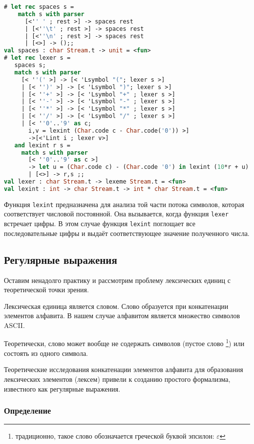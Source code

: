 \begin{lstlisting}[language=Caml]
# let rec spaces s =
    match s with parser
      [<'' ' ; rest >] -> spaces rest
      | [<''\t' ; rest >] -> spaces rest
      | [<''\n' ; rest >] -> spaces rest
      | [<>] -> ();;
val spaces : char Stream.t -> unit = <fun>
# let rec lexer s =
   spaces s;
   match s with parser
     [< ''(' >] -> [< 'Lsymbol "("; lexer s >]
     | [< '')' >] -> [< 'Lsymbol ")"; lexer s >]
     | [< ''+' >] -> [< 'Lsymbol "+" ; lexer s >]
     | [< ''-' >] -> [< 'Lsymbol "-" ; lexer s >]
     | [< ''*' >] -> [< 'Lsymbol "*" ; lexer s >]
     | [< ''/' >] -> [< 'Lsymbol "/" ; lexer s >]
     | [< ''0'..'9' as c;
       i,v = lexint (Char.code c - Char.code('0')) >]
       ->[<'Lint i ; lexer v>]
   and lexint r s =
     match s with parser
       [< ''0'..'9' as c >]
       -> let u = (Char.code c) - (Char.code '0') in lexint (10*r + u) s
       | [<>] -> r,s ;;
val lexer : char Stream.t -> lexeme Stream.t = <fun>
val lexint : int -> char Stream.t -> int * char Stream.t = <fun>
\end{lstlisting}

Функция \texttt{lexint} предназначена для анализа той части потока символов,
которая соответствует числовой постоянной. Она вызывается, когда функция
\texttt{lexer} встречает цифры. В этом случае функция \texttt{lexint} поглощает
все последовательные цифры и выдаёт соответствующее значение полученного числа.

\subsection{Регулярные выражения}

Оставим ненадолго практику и рассмотрим проблему лексических единиц с
теоретической точки зрения.

Лексическая единица является словом. Слово образуется при конкатенации элементов
алфавита. В нашем случае алфавитом является множество символов ASCII.

Теоретически, слово может вообще не содержать символов (пустое слово
\footnote{традиционно, такое слово обозначается греческой буквой эпсилон:
$\varepsilon$}) или состоять из одного символа.

Теоретические исследования конкатенации элементов алфавита для образования
лексических элементов (лексем) привели к созданию простого формализма,
известного как регулярные выражения.

\subsubsection{Определение}

